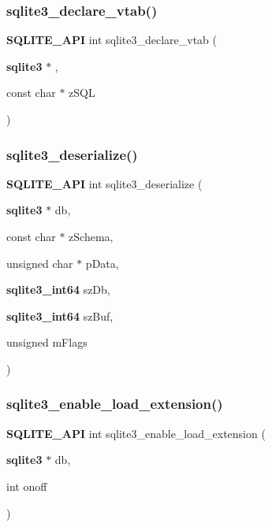 \mbox{\label{sqlite3_8h_a65393c41da76ae1470a7c7f4b4aca600}} 
\subsubsection{sqlite3\_declare\_vtab()}
{\footnotesize\ttfamily \textbf{ S\+Q\+L\+I\+T\+E\+\_\+\+A\+PI} int sqlite3\+\_\+declare\+\_\+vtab (\begin{DoxyParamCaption}\item[{\textbf{ sqlite3} $\ast$}]{,  }\item[{const char $\ast$}]{z\+S\+QL }\end{DoxyParamCaption})}

\mbox{\label{sqlite3_8h_a60c5dfd8e59e7538699318fca6ad9a6e}} 
\subsubsection{sqlite3\_deserialize()}
{\footnotesize\ttfamily \textbf{ S\+Q\+L\+I\+T\+E\+\_\+\+A\+PI} int sqlite3\+\_\+deserialize (\begin{DoxyParamCaption}\item[{\textbf{ sqlite3} $\ast$}]{db,  }\item[{const char $\ast$}]{z\+Schema,  }\item[{unsigned char $\ast$}]{p\+Data,  }\item[{\textbf{ sqlite3\+\_\+int64}}]{sz\+Db,  }\item[{\textbf{ sqlite3\+\_\+int64}}]{sz\+Buf,  }\item[{unsigned}]{m\+Flags }\end{DoxyParamCaption})}

\mbox{\label{sqlite3_8h_aefe61691e3cdb600b0b104ce920d147d}} 
\subsubsection{sqlite3\_enable\_load\_extension()}
{\footnotesize\ttfamily \textbf{ S\+Q\+L\+I\+T\+E\+\_\+\+A\+PI} int sqlite3\+\_\+enable\+\_\+load\+\_\+extension (\begin{DoxyParamCaption}\item[{\textbf{ sqlite3} $\ast$}]{db,  }\item[{int}]{onoff }\end{DoxyParamCaption})}

